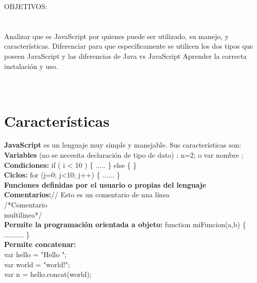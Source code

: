 \documentclass[11pt]{article} %
\begin{document}
OBJETIVOS:
\\ \\
\\Analizar que es JavaScript por quienes puede ser utilizado, su manejo, y características.
Diferenciar para que específicamente se utilicen los dos tipos que poseen JavaScript y las diferencias de Java vs JavaScript
Aprender la correcta instalación y uso.\\\\\\

\section{Características}
{\bfseries JavaScript} es un lenguaje muy simple y manejable. Sus  características son:\\

\textbf{Variables} (no se necesita declaración de tipo de dato) : n=2; o var nombre ;\\
\textbf{Condiciones:} if ( i < 10 ) \{ ..... \} else \{ \}\\
\textbf{Ciclos:} for (j=0; j<10; j++) \{ ...... \} \\
\textbf{Funciones definidas por el usuario o propias del lenguaje}\\
\textbf{Comentarios:}// Esto es un comentario de una línea\\
/*Comentario\\
multilinea*/   \\
\textbf{Permite la programación orientada a objeto:} function miFuncion(a,b) \{ .......... \} \\
\textbf{Permite concatenar:}\\
var hello = "Hello "; \\
var world = "world!";\\
var n = hello.concat(world);
\end{document}
